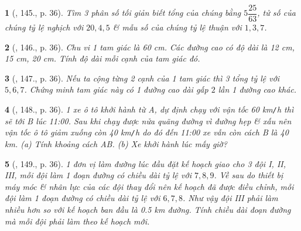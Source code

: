 \documentclass{article}
\newtheorem{baitoan}{}
\begin{document}
\begin{baitoan}[\cite{Tuyen_Toan_7}, 145., p. 36]
	Tìm 3 phân số tối giản biết tổng của chúng bằng $5\dfrac{25}{63}$, tử số của chúng tỷ lệ nghịch với $20,4,5$ \& mẫu số của chúng tỷ lệ thuận với $1,3,7$.
\end{baitoan}

\begin{baitoan}[\cite{Tuyen_Toan_7}, 146., p. 36]
	Chu vi 1 tam giác là {\rm60 cm}. Các đường cao có độ dài là {\rm12 cm, 15 cm, 20 cm}. Tính độ dài mỗi cạnh của tam giác đó.
\end{baitoan}

\begin{baitoan}[\cite{Tuyen_Toan_7}, 147., p. 36]
	Nếu ta cộng từng 2 cạnh của 1 tam giác thì 3 tổng tỷ lệ với $5,6,7$. Chứng minh tam giác này có 1 đường cao dài gấp $2$ lần 1 đường cao khác.
\end{baitoan}

\begin{baitoan}[\cite{Tuyen_Toan_7}, 148., p. 36]
	1 xe ô tô khởi hành từ A, dự định chạy với vận tốc {\rm60 km{\tt/}h} thì sẽ tới B lúc 11:00. Sau khi chạy được nửa quãng đường vì đường hẹp \& xấu nên vận tốc ô tô giảm xuống còn {\rm40 km{\tt/}h} do đó đến 11:00 xe vẫn còn cách B là {\rm40 km}. (a) Tính khoảng cách AB. (b) Xe khởi hành lúc mấy giờ?
\end{baitoan}

\begin{baitoan}[\cite{Tuyen_Toan_7}, 149., p. 36]
	1 đơn vị làm đường lúc đầu đặt kế hoạch giao cho 3 đội I, II, III, mỗi đội làm 1 đoạn đường có chiều dài tỷ lệ với $7,8,9$. Về sau do thiết bị máy móc \& nhân lực của các đội thay đổi nên kế hoạch đã được điều chỉnh, mỗi đội làm 1 đoạn đường có chiều dài tỷ lệ với $6,7,8$. Như vậy đội III phải làm nhiều hơn so với kế hoạch ban đầu là {\rm0.5 km} đường. Tính chiều dài đoạn đường mà mỗi đội phải làm theo kế hoạch mới.
\end{baitoan}


\printbibliography[heading=bibintoc]
	
\end{document}
